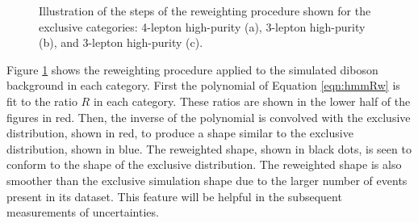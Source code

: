 \begin{figure}[h!]
\captionsetup[subfigure]{position=b}
\centering
{}
\caption{Illustration of the steps of the reweighting procedure shown for the exclusive categories: 4-lepton high-purity (a), 3-lepton high-purity (b), and 3-lepton high-purity (c).}
\label{fig:hmmRw}
\end{figure}

Figure \ref{fig:hmmRw} shows the reweighting procedure applied to the simulated diboson background in each category.
First the polynomial of Equation \ref{eqn:hmmRw} is fit to the ratio $R$ in each category.
These ratios are shown in the lower half of the figures in red.
Then, the inverse of the polynomial is convolved with the exclusive distribution, shown in red, to produce a shape similar to the exclusive distribution, shown in blue.
The reweighted shape, shown in black dots, is seen to conform to the shape of the exclusive distribution.
The reweighted shape is also smoother than the exclusive simulation shape due to the larger number of events present in its dataset.
This feature will be helpful in the subsequent measurements of uncertainties.

